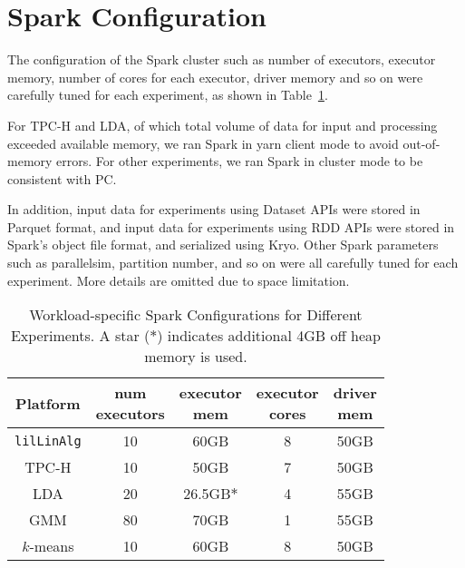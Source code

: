\section{Spark Configuration}
\label{sec:spark}

The configuration of the Spark cluster such as number of
executors, executor memory, number of cores for each executor, driver
memory and so on were carefully tuned for each
experiment, as shown in Table~\ref{fig:sparkConf}.

For TPC-H and LDA, of which total volume of data for input and
processing exceeded available memory, we ran Spark in yarn client
mode to avoid out-of-memory errors. For other experiments, we ran Spark
in cluster mode to be consistent with PC.

In addition, input data for experiments
using Dataset APIs were stored in Parquet format, and input data for
experiments using RDD APIs were stored in Spark's object file format,
and serialized using Kryo. Other Spark parameters such as parallelsim,
partition number, and so on were all carefully tuned for each experiment. More details
are omitted due to space limitation.

\begin{table}[H]
\begin{center}
\begin{tabular}{|c||c|c|c|c|}
\hline
Platform & \makecell{num\\executors} & \makecell{executor \\mem} & \makecell{executor \\cores}& \makecell{driver \\mem}\\
\hline
\texttt{lilLinAlg} &10 & 60GB & 8 & 50GB \\
TPC-H &10 & 50GB & 7 & 50GB \\
LDA &20 & 26.5GB$*$ &4 & 55GB\\
GMM&80 & 70GB & 1 & 55GB\\
$k$-means &10 &60GB & 8 & 50GB\\
\hline
\end{tabular}
\caption{Workload-specific Spark Configurations for Different
  Experiments. A star ($*$) indicates additional 4GB off heap memory is used.}
\label{fig:sparkConf}
\end{center}
\end{table}

